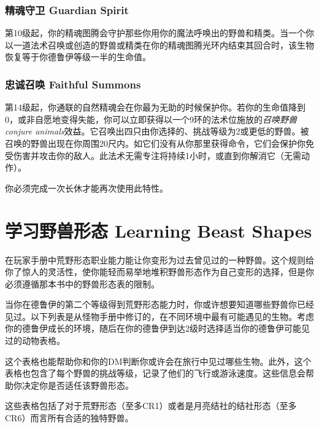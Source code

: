\subsubsection{精魂守卫 Guardian Spirit}
第10级起，你的精魂图腾会守护那些你用你的魔法呼唤出的野兽和精类。当一个你以一道法术召唤或创造的野兽或精类在你的精魂图腾光环内结束其回合时，该生物恢复等于你德鲁伊等级一半的生命值。

\subsubsection{忠诚召唤 Faithful Summons}

第14级起，你通联的自然精魂会在你最为无助的时候保护你。若你的生命值降到0，或非自愿地变得失能，你可以立即获得以一个9环的法术位施放的\emph{召唤野兽 conjure animals}效益。它召唤出四只由你选择的、挑战等级为2或更低的野兽。被召唤的野兽出现在你周围20尺内。如它们没有从你那里获得命令，它们会保护你免受伤害并攻击你的敌人。此法术无需专注将持续1小时，或直到你解消它（无需动作）。

你必须完成一次长休才能再次使用此特性。

\section{学习野兽形态 Learning Beast Shapes}
在玩家手册中荒野形态职业能力能让你变形为过去曾见过的一种野兽。这个规则给你了惊人的灵活性，使你能轻而易举地堆积野兽形态作为自己变形的选择，但是你必须遵循那本书中的野兽形态表的限制。

当你在德鲁伊的第二个等级得到荒野形态能力时，你或许想要知道哪些野兽你已经见过。以下列表是从怪物手册中修订的，在不同环境中最有可能遇见的生物。考虑你的德鲁伊成长的环境，随后在你的德鲁伊到达2级时选择适当你的德鲁伊可能见过的动物表格。

这个表格也能帮助你和你的DM判断你或许会在旅行中见过哪些生物。此外，这个表格也包含了每个野兽的挑战等级，记录了他们的飞行或游泳速度。这些信息会帮助你决定你是否适任该野兽形态。

这些表格包括了对于荒野形态（至多CR1）或者是月亮结社的结社形态（至多CR6）而言所有合适的独特野兽。


